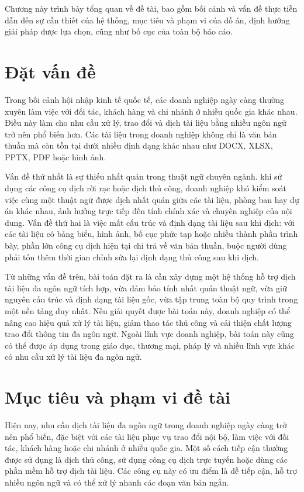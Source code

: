 \documentclass[../DoAn.tex]{subfiles}
\begin{document}
Chương này trình bày tổng quan về đề tài, bao gồm bối cảnh và vấn đề thực tiễn dẫn đến sự cần thiết của hệ thống, mục tiêu và phạm vi của đồ án, định hướng giải pháp được lựa chọn, cũng như bố cục của toàn bộ báo cáo.

\section{Đặt vấn đề}
\label{section:1.1}
Trong bối cảnh hội nhập kinh tế quốc tế, các doanh nghiệp ngày càng thường xuyên làm việc với đối tác, khách hàng và chi nhánh ở nhiều quốc gia khác nhau. Điều này làm cho nhu cầu xử lý, trao đổi và dịch tài liệu bằng nhiều ngôn ngữ trở nên phổ biến hơn. Các tài liệu trong doanh nghiệp không chỉ là văn bản thuần mà còn tồn tại dưới nhiều định dạng khác nhau như DOCX, XLSX, PPTX, PDF hoặc hình ảnh.

Vấn đề thứ nhất là sự thiếu nhất quán trong thuật ngữ chuyên ngành. khi sử dụng các công cụ dịch rời rạc hoặc dịch thủ công, doanh nghiệp khó kiểm soát việc cùng một thuật ngữ được dịch nhất quán giữa các tài liệu, phòng ban hay dự án khác nhau, ảnh hưởng trực tiếp đến tính chính xác và chuyên nghiệp của nội dung. Vấn đề thứ hai là việc mất cấu trúc và định dạng tài liệu sau khi dịch: với các tài liệu có bảng biểu, hình ảnh, bố cục phức tạp hoặc nhiều thành phần trình bày, phần lớn công cụ dịch hiện tại chỉ trả về văn bản thuần, buộc người dùng phải tốn thêm thời gian chỉnh sửa lại định dạng thủ công sau khi dịch.

Từ những vấn đề trên, bài toán đặt ra là cần xây dựng một hệ thống hỗ trợ dịch tài liệu đa ngôn ngữ tích hợp, vừa đảm bảo tính nhất quán thuật ngữ, vừa giữ nguyên cấu trúc và định dạng tài liệu gốc, vừa tập trung toàn bộ quy trình trong một nền tảng duy nhất. Nếu giải quyết được bài toán này, doanh nghiệp có thể nâng cao hiệu quả xử lý tài liệu, giảm thao tác thủ công và cải thiện chất lượng trao đổi thông tin đa ngôn ngữ. Ngoài lĩnh vực doanh nghiệp, bài toán này cũng có thể được áp dụng trong giáo dục, thương mại, pháp lý và nhiều lĩnh vực khác có nhu cầu xử lý tài liệu đa ngôn ngữ.

\section{Mục tiêu và phạm vi đề tài}
\label{section:1.2}
Hiện nay, nhu cầu dịch tài liệu đa ngôn ngữ trong doanh nghiệp ngày càng trở nên phổ biến, đặc biệt với các tài liệu phục vụ trao đổi nội bộ, làm việc với đối tác, khách hàng hoặc chi nhánh ở nhiều quốc gia. Một số cách tiếp cận thường được sử dụng là dịch thủ công, sử dụng công cụ dịch trực tuyến hoặc dùng các phần mềm hỗ trợ dịch tài liệu. Các công cụ này có ưu điểm là dễ tiếp cận, hỗ trợ nhiều ngôn ngữ và có thể xử lý nhanh các đoạn văn bản ngắn.
\end{document}
